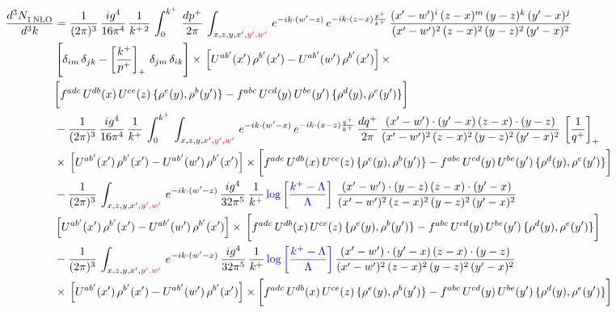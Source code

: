 \documentclass[9pt]{article}
\numberwithin{equation}{section}
\begin{document}
\begin{align}
     \frac{d^{3}N_{1\,\rm NLO}^{\rm}}{d^{3}k}  & = \frac{1}{(2\pi)^{3}}\, \frac{ig^{4}}{16\pi^{4}}\, \frac{1}{k^{+\,2}}\,\int_{0}^{k^{+}}\, \frac{dp^{+}}{2\pi}\,\int_{x,z,y,x',{\color{red}y',w'}}\,e^{-ik\cdot (w^\prime-z)}\,e^{-ik\cdot (z-x)\frac{p^{+}}{k^{+}}}\,\frac{(x'-w')^{i}\,(z-x)^{m}\,(y-z)^{k}\,(y'-x)^{j}}{(x'-w')^{2}\,(z-x)^{2}\,(y-z)^{2}\,(y'-x)^{2}}\,\notag \\ & \left[\delta_{im}\,\delta_{jk}-\left[\frac{k^{+}}{p^{+}}\right]_{+}\, \delta_{jm}\,\delta_{ik}\right]\times\, \left[U^{ab'}(x')\,\rho^{b'}(x')-U^{ab'}(w')\,\rho^{b'}(x')\right]\times\notag \\ & \bigg[f^{adc}\,U^{db}(x)\,U^{ce}(z)\, \{\rho^{e}(y),\rho^{b}(y')\}-f^{abc}\,U^{cd}(y)\,U^{be}(y')\, \{\rho^{d}(y),\rho^{e}(y')\}\bigg]\notag \\ & -\frac{1}{(2\pi)^{3}}\, \frac{ig^{4}}{16\pi^{4}}\, \frac{1}{k^{+}}\,\int_{0}^{k^{+}}\, \int_{x,z,y,x',{\color{red}y',w'}}\,e^{-ik\cdot (w^\prime-x)}\,e^{-ik\cdot (x-z)\frac{q^{+}}{k^{+}}}\,\frac{dq^{+}}{2\pi}\,\frac{(x'-w')\cdot (y'-x)\,(z-x)\cdot (y-z)}{(x'-w')^{2}\,(z-x)^{2}\,(y-z)^{2}\,(y'-x)^{2}}\,\left[\frac{1}{q^{+}}\right]_{+}\notag \\ & \times\, \left[U^{ab'}(x')\,\rho^{b'}(x')-U^{ab'}(w')\,\rho^{b'}(x')\right]\times \bigg[f^{adc}\,U^{db}(x)\,U^{ce}(z)\, \{\rho^{e}(y),\rho^{b}(y')\}-f^{abc}\,U^{cd}(y)\,U^{be}(y')\, \{\rho^{d}(y),\rho^{e}(y')\}\bigg]\notag \\ & -\frac{1}{(2\pi)^{3}}\, \int_{x,z,y,x',{\color{red}y',w'}}\,e^{-ik\cdot (w^\prime-z)}\,\frac{ig^{4}}{32\pi^{5}}\, \frac{1}{k^{+}}\,{\color{blue} \log{\left[\frac{k^{+}-\Lambda}{\Lambda}\right]}}\,\,\frac{(x'-w')\cdot (y-z)\,(z-x)\cdot (y'-x)}{(x'-w')^{2}\,(z-x)^{2}\,(y-z)^{2}\,(y'-x)^{2}}\,\notag \\ & \left[U^{ab'}(x')\,\rho^{b'}(x')-U^{ab'}(w')\,\rho^{b'}(x')\right]\times\, \bigg[f^{adc}\,U^{db}(x)\,U^{ce}(z)\, \{\rho^{e}(y),\rho^{b}(y')\}-f^{abc}\,U^{cd}(y)\,U^{be}(y')\, \{\rho^{d}(y),\rho^{e}(y')\}\bigg]\notag \\ &  -\frac{1}{(2\pi)^{3}}\, \int_{x,z,y,x',{\color{red}y',w'}}\,e^{-ik\cdot (w^\prime-x)}\,\frac{ig^{4}}{32\pi^{5}}\, \frac{1}{k^{+}}\,{\color{blue} \log{\left[\frac{k^{+}-\Lambda}{\Lambda}\right]}}\,\frac{(x'-w')\cdot (y'-x)\,(z-x)\cdot (y-z)}{(x'-w')^{2}\,(z-x)^{2}\,(y-z)^{2}\,(y'-x)^{2}}\notag \\ & \times\, \left[U^{ab'}(x')\,\rho^{b'}(x')-U^{ab'}(w')\,\rho^{b'}(x')\right]\times \bigg[f^{adc}\,U^{db}(x)\,U^{ce}(z)\, \{\rho^{e}(y),\rho^{b}(y')\}-f^{abc}\,U^{cd}(y)\,U^{be}(y')\, \{\rho^{d}(y),\rho^{e}(y')\}\bigg]
\end{align}
\end{document}
